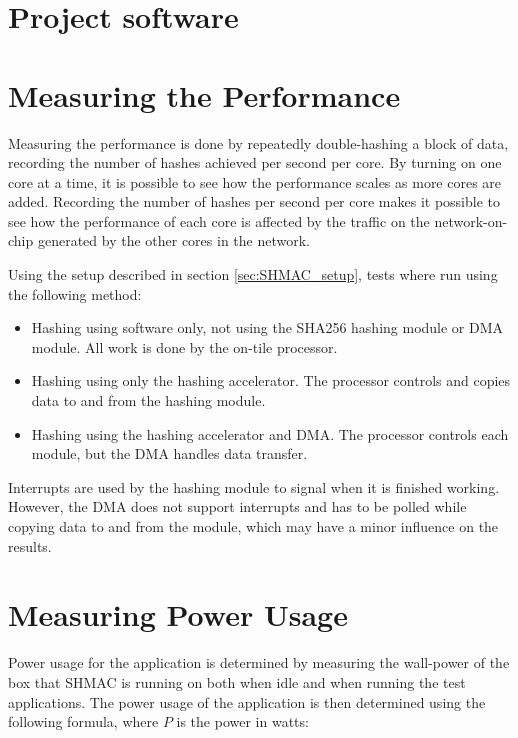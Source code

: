 \section{Project software}

\section{Measuring the Performance}

Measuring the performance is done by repeatedly double-hashing a block of data, recording the
number of hashes achieved per second per core. By turning on one core at a time, it
is possible to see how the performance scales as more cores are added. Recording
the number of hashes per second per core makes it possible to see how the performance
of each core is affected by the traffic on the network-on-chip generated by the other
cores in the network.

Using the setup described in section \ref{sec:SHMAC_setup}, tests where run using the
following method:

\begin{itemize}
    \item Hashing using software only, not using the SHA256 hashing module or DMA module.
    All work is done by the on-tile processor.
    \item Hashing using only the hashing accelerator.
    The processor controls and copies data to and from the hashing module.
    \item Hashing using the hashing accelerator and DMA.
    The processor controls each module, but the DMA handles data transfer.
\end{itemize}

Interrupts are used by the hashing module to signal when it is finished working. However,
the DMA does not support interrupts and has to be polled while copying data to and from
the module, which may have a minor influence on the results.

\section{Measuring Power Usage}

Power usage for the application is determined by measuring the wall-power of the box
that SHMAC is running on both when idle and when running the test applications. The
power usage of the application is then determined using the following formula, where
$P$ is the power in watts:


